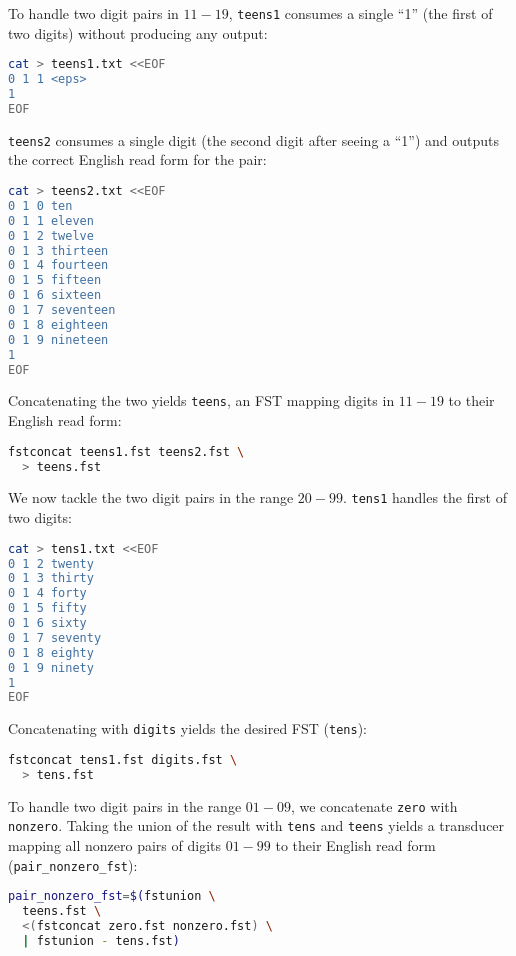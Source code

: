 \documentclass[a4paper,oneside,reqno]{amsart}
\begin{document}
\begin{enumerate}[label=\arabic*.]
    To handle two digit pairs in $11-19$, \texttt{teens1} consumes a single
    ``1'' (the first of two digits) without producing any output:
    \begin{lstlisting}[language=bash]
cat > teens1.txt <<EOF
0 1 1 <eps>
1
EOF
    \end{lstlisting}
    \texttt{teens2} consumes a single digit (the second digit after seeing a ``1'')
    and outputs the correct English read form for the pair:
    \begin{lstlisting}[language=bash]
cat > teens2.txt <<EOF
0 1 0 ten
0 1 1 eleven
0 1 2 twelve
0 1 3 thirteen
0 1 4 fourteen
0 1 5 fifteen
0 1 6 sixteen
0 1 7 seventeen
0 1 8 eighteen
0 1 9 nineteen
1
EOF
    \end{lstlisting}
    Concatenating the two yields \texttt{teens}, an FST mapping digits in $11-19$
    to their English read form:
    \begin{lstlisting}[language=bash]
fstconcat teens1.fst teens2.fst \
  > teens.fst
    \end{lstlisting}

    We now tackle the two digit pairs in the range $20-99$.
    \texttt{tens1} handles the first of two digits:
    \begin{lstlisting}[language=bash]
cat > tens1.txt <<EOF
0 1 2 twenty
0 1 3 thirty
0 1 4 forty
0 1 5 fifty
0 1 6 sixty
0 1 7 seventy
0 1 8 eighty
0 1 9 ninety
1
EOF
    \end{lstlisting}
    Concatenating with \texttt{digits} yields the desired FST (\texttt{tens}):
    \begin{lstlisting}[language=bash]
fstconcat tens1.fst digits.fst \
  > tens.fst
    \end{lstlisting}

    To handle two digit pairs in the range $01-09$, we concatenate \texttt{zero}
    with \texttt{nonzero}. Taking the union of the result with \texttt{tens}
    and \texttt{teens} yields a transducer mapping all nonzero pairs of digits $01-99$
    to their English read form (\texttt{pair\_nonzero\_fst}):
    \begin{lstlisting}[language=bash]
pair_nonzero_fst=$(fstunion \
  teens.fst \
  <(fstconcat zero.fst nonzero.fst) \
  | fstunion - tens.fst)
    \end{lstlisting}


\end{enumerate}
\end{document}
